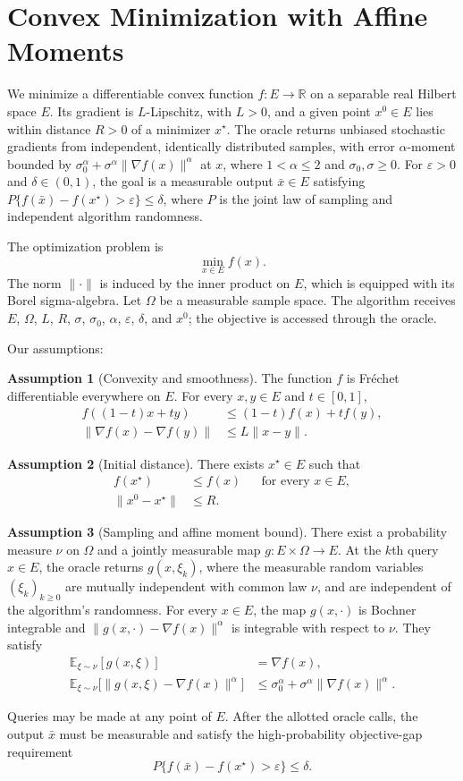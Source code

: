 \documentclass[10pt]{article}
\theoremstyle{definition}
\newtheorem{assumption}{Assumption}
\begin{document}
\section*{Convex Minimization with Affine Moments}
We minimize a differentiable convex function $f:E\to\mathbb{R}$ on a separable real Hilbert space $E$. Its gradient is $L$-Lipschitz, with $L>0$, and a given point $x^0\in E$ lies within distance $R>0$ of a minimizer $x^\star$. The oracle returns unbiased stochastic gradients from independent, identically distributed samples, with error $\alpha$-moment bounded by $\sigma_0^\alpha+\sigma^\alpha\|\nabla f(x)\|^\alpha$ at $x$, where $1<\alpha\leq2$ and $\sigma_0,\sigma\geq0$. For $\varepsilon>0$ and $\delta\in(0,1)$, the goal is a measurable output $\bar{x}\in E$ satisfying $P\{f(\bar{x})-f(x^\star)>\varepsilon\}\leq\delta$, where $P$ is the joint law of sampling and independent algorithm randomness.

The optimization problem is
\[
\min_{x\in E} f(x).
\]
The norm $\|\cdot\|$ is induced by the inner product on $E$, which is equipped with its Borel sigma-algebra. Let $\Omega$ be a measurable sample space. The algorithm receives $E$, $\Omega$, $L$, $R$, $\sigma$, $\sigma_0$, $\alpha$, $\varepsilon$, $\delta$, and $x^0$; the objective is accessed through the oracle.

Our assumptions:
\begin{assumption}[Convexity and smoothness]
The function $f$ is Fr\'echet differentiable everywhere on $E$. For every $x,y\in E$ and $t\in[0,1]$,
\[
\begin{aligned}
f((1-t)x+ty)&\leq (1-t)f(x)+t f(y),\\
\|\nabla f(x)-\nabla f(y)\|&\leq L\|x-y\|.
\end{aligned}
\]
\end{assumption}

\begin{assumption}[Initial distance]
There exists $x^\star\in E$ such that
\[
\begin{aligned}
f(x^\star)&\leq f(x) &&\text{for every }x\in E,\\
\|x^0-x^\star\|&\leq R.
\end{aligned}
\]
\end{assumption}

\begin{assumption}[Sampling and affine moment bound]
There exist a probability measure $\nu$ on $\Omega$ and a jointly measurable map $g:E\times\Omega\to E$. At the $k$th query $x\in E$, the oracle returns $g(x,\xi_k)$, where the measurable random variables $(\xi_k)_{k\geq0}$ are mutually independent with common law $\nu$, and are independent of the algorithm's randomness. For every $x\in E$, the map $g(x,\cdot)$ is Bochner integrable and $\|g(x,\cdot)-\nabla f(x)\|^\alpha$ is integrable with respect to $\nu$. They satisfy
\[
\begin{aligned}
\mathbb{E}_{\xi\sim\nu}[g(x,\xi)]&=\nabla f(x),\\
\mathbb{E}_{\xi\sim\nu}\bigl[\|g(x,\xi)-\nabla f(x)\|^\alpha\bigr]
&\leq \sigma_0^\alpha+\sigma^\alpha\|\nabla f(x)\|^\alpha.
\end{aligned}
\]
\end{assumption}

Queries may be made at any point of $E$. After the allotted oracle calls, the output $\bar{x}$ must be measurable and satisfy the high-probability objective-gap requirement
\[
P\bigl\{f(\bar{x})-f(x^\star)>\varepsilon\bigr\}\leq\delta.
\]
\end{document}
